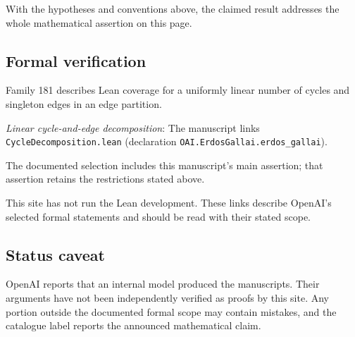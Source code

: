 \documentclass[11pt]{article}
\begin{document}
With the hypotheses and conventions above, the claimed result addresses the whole mathematical assertion on this page.

\subsection{Formal verification}
Family 181 describes Lean coverage for a uniformly linear number of cycles and singleton edges in an edge partition.

\textit{Linear cycle-and-edge decomposition}: The manuscript links \texttt{CycleDecomposition.lean} (declaration \texttt{OAI.ErdosGallai.erdos\_gallai}).

The documented selection includes this manuscript’s main assertion; that assertion retains the restrictions stated above.

This site has not run the Lean development. These links describe OpenAI’s selected formal statements and should be read with their stated scope.

\subsection{Status caveat}
OpenAI reports that an internal model produced the manuscripts. Their arguments have not been independently verified as proofs by this site. Any portion outside the documented formal scope may contain mistakes, and the catalogue label reports the announced mathematical claim.
\end{document}
